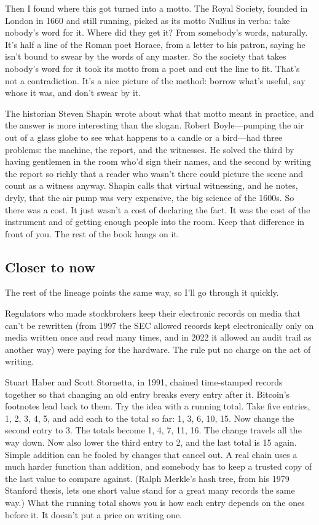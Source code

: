 \documentclass[11pt,twoside]{article}
\theoremstyle{thielethm}
\theoremstyle{thieledef}
\theoremstyle{thieledef}
\theoremstyle{thieledef}
\theoremstyle{thielethm}
\theoremstyle{thieleobs}
\theoremstyle{thielethm}
\begin{document}
Then I found where this got turned into a motto. The Royal Society, founded in London in 1660 and still running, picked as its motto Nullius in verba: take nobody's word for it. Where did they get it? From somebody's words, naturally. It's half a line of the Roman poet Horace, from a letter to his patron, saying he isn't bound to swear by the words of any master. So the society that takes nobody's word for it took its motto from a poet and cut the line to fit. That's not a contradiction. It's a nice picture of the method: borrow what's useful, say whose it was, and don't swear by it.

The historian Steven Shapin wrote about what that motto meant in practice, and the answer is more interesting than the slogan. Robert Boyle---pumping the air out of a glass globe to see what happens to a candle or a bird---had three problems: the machine, the report, and the witnesses. He solved the third by having gentlemen in the room who'd sign their names, and the second by writing the report so richly that a reader who wasn't there could picture the scene and count as a witness anyway. Shapin calls that virtual witnessing, and he notes, dryly, that the air pump was very expensive, the big science of the 1600s. So there was a cost. It just wasn't a cost of declaring the fact. It was the cost of the instrument and of getting enough people into the room. Keep that difference in front of you. The rest of the book hangs on it.

\subsection{Closer to now}

The rest of the lineage points the same way, so I'll go through it quickly.

Regulators who made stockbrokers keep their electronic records on media that can't be rewritten (from 1997 the SEC allowed records kept electronically only on media written once and read many times, and in 2022 it allowed an audit trail as another way) were paying for the hardware. The rule put no charge on the act of writing.

Stuart Haber and Scott Stornetta, in 1991, chained time-stamped records together so that changing an old entry breaks every entry after it. Bitcoin's footnotes lead back to them. Try the idea with a running total. Take five entries, 1, 2, 3, 4, 5, and add each to the total so far: 1, 3, 6, 10, 15. Now change the second entry to 3. The totals become 1, 4, 7, 11, 16. The change travels all the way down. Now also lower the third entry to 2, and the last total is 15 again. Simple addition can be fooled by changes that cancel out. A real chain uses a much harder function than addition, and somebody has to keep a trusted copy of the last value to compare against. (Ralph Merkle's hash tree, from his 1979 Stanford thesis, lets one short value stand for a great many records the same way.) What the running total shows you is how each entry depends on the ones before it. It doesn't put a price on writing one.
\end{document}
